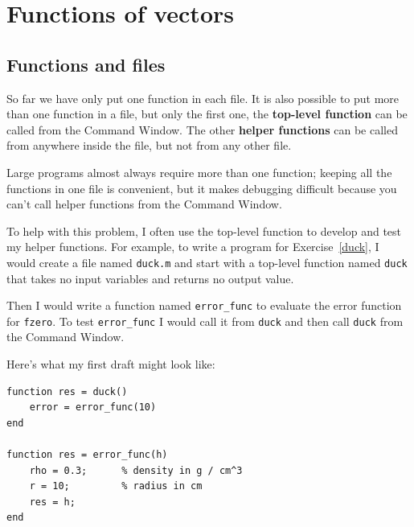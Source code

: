 \documentclass{book}
\begin{document}










\chapter{Functions of vectors}


\section{Functions and files}
\label{funfiles}

So far we have only put one function in each file.  It is also
possible to put more than one function in a file, but only the first
one, the {\bf top-level function} can be called from the Command
Window.  The other {\bf helper functions} can be called from anywhere
inside the file, but not from any other file.

Large programs almost always require more than one function; keeping
all the functions in one file is convenient, but it makes debugging
difficult because you can't call helper functions from the Command
Window.

To help with this problem, I often use the top-level function
to develop and test my helper functions.  For example, to write
a program for Exercise~\ref{duck}, I would create a file named
{\tt duck.m} and start with a top-level function named {\tt duck}
that takes no input variables and returns no output value.

Then I would write a function named {\tt error\_func} to
evaluate the error function for {\tt fzero}.  To test
{\tt error\_func} I would call it from {\tt duck} and then
call {\tt duck} from the Command Window.

Here's what my first draft might look like:

\begin{verbatim}
function res = duck()
    error = error_func(10)
end

function res = error_func(h)
    rho = 0.3;      % density in g / cm^3
    r = 10;         % radius in cm
    res = h;
end
\end{verbatim}
\end{document}
